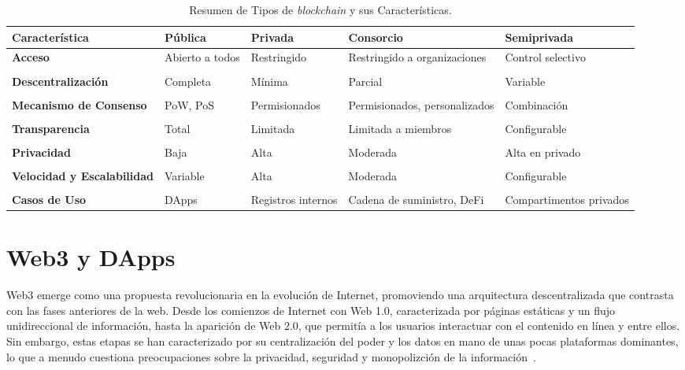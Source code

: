 \begin{table}
\small
\begin{centering}
		\begin{tabular}{@{}p{3.3cm} p{2cm} p{2.5cm} p{2.5cm} p{2.5cm}@{}}
		\toprule
		\textbf{Característica} & \textbf{Pública} & \textbf{Privada} & \textbf{Consorcio} & \textbf{Semiprivada} \\ 
		\midrule
		\textbf{Acceso} & Abierto a todos & Restringido & Restringido a organizaciones & Control selectivo \\\\
		\textbf{Descentralización} & Completa & Mínima & Parcial & Variable \\\\
		\textbf{Mecanismo de Consenso} & PoW, PoS & Permisionados & Permisionados, personalizados & Combinación \\\\
		\textbf{Transparencia} & Total & Limitada & Limitada a miembros & Configurable \\\\
		\textbf{Privacidad} & Baja & Alta & Moderada & Alta en privado \\\\
		\textbf{Velocidad y Escalabilidad} & Variable & Alta & Moderada & Configurable \\\\
		\textbf{Casos de Uso} & DApps & Registros internos & Cadena de suministro, DeFi & Compartimentos privados \\
		\bottomrule
		\end{tabular}
\end{centering}
\caption{Resumen de Tipos de \textit{blockchain} y sus Características.}
\label{tab:tabla_blockchain_caracteristicas}	
\end{table}



\section{Web3 y DApps}

Web3 emerge como una propuesta revolucionaria en la evolución de Internet, promoviendo una arquitectura descentralizada que contrasta con las fases anteriores de la web.
Desde los comienzos de Internet con Web 1.0, caracterizada por páginas estáticas y un flujo unidireccional de información, hasta la aparición de Web 2.0, que permitía a los usuarios interactuar con el contenido en línea y entre ellos. 
Sin embargo, estas etapas se han caracterizado por su centralización del poder y los datos en mano de unas pocas plataformas dominantes, lo que a menudo cuestiona preocupaciones sobre la privacidad, seguridad y monopolizción de la información~\cite{Web3}. 

